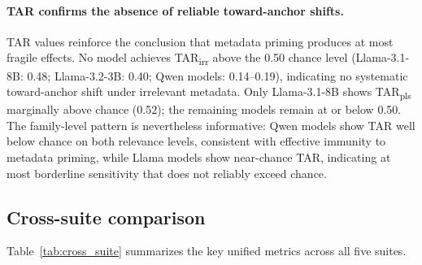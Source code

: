 \paragraph{TAR confirms the absence of reliable toward-anchor
  shifts.}
TAR values reinforce the conclusion that metadata priming
produces at most fragile effects.
No model achieves TAR\textsubscript{irr} above the 0.50
chance level (Llama-3.1-8B: 0.48; Llama-3.2-3B: 0.40;
Qwen models: 0.14--0.19), indicating no systematic
toward-anchor shift under irrelevant metadata.
Only Llama-3.1-8B shows TAR\textsubscript{pls} marginally
above chance (0.52); the remaining models remain at or below
0.50.
The family-level pattern is nevertheless informative:
Qwen models show TAR well below chance on both relevance
levels, consistent with effective immunity to metadata
priming, while Llama models show near-chance TAR, indicating
at most borderline sensitivity that does not reliably exceed
chance.

\subsection{Cross-suite comparison}
\label{sec:cross-suite}

Table~\ref{tab:cross_suite} summarizes the key unified
metrics across all five suites.

